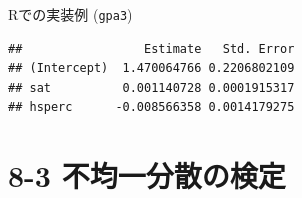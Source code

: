 \documentclass[
  ignorenonframetext,
]{beamer}
\newenvironment{Shaded}{\begin{snugshade}}{\end{snugshade}}
\newcommand{\AttributeTok}[1]{\textcolor[rgb]{0.13,0.29,0.53}{#1}}
\newcommand{\CommentTok}[1]{\textcolor[rgb]{0.56,0.35,0.01}{\textit{#1}}}
\newcommand{\DecValTok}[1]{\textcolor[rgb]{0.00,0.00,0.81}{#1}}
\newcommand{\FunctionTok}[1]{\textcolor[rgb]{0.13,0.29,0.53}{\textbf{#1}}}
\newcommand{\NormalTok}[1]{#1}
\newcommand{\OtherTok}[1]{\textcolor[rgb]{0.56,0.35,0.01}{#1}}
\newcommand{\SpecialCharTok}[1]{\textcolor[rgb]{0.81,0.36,0.00}{\textbf{#1}}}
\newcommand{\StringTok}[1]{\textcolor[rgb]{0.31,0.60,0.02}{#1}}
\begin{document}
\begin{frame}[fragile]{Rでの実装例 (\texttt{gpa3})}
\label{rux3067ux306eux5b9fux88c5ux4f8b-gpa3}
\footnotesize

\begin{Shaded}
\end{Shaded}

\begin{verbatim}
##                 Estimate   Std. Error
## (Intercept)  1.470064766 0.2206802109
## sat          0.001140728 0.0001915317
## hsperc      -0.008566358 0.0014179275
\end{verbatim}

\normalsize
\end{frame}

\section{8-3
不均一分散の検定}\label{ux4e0dux5747ux4e00ux5206ux6563ux306eux691cux5b9a}
\end{document}
